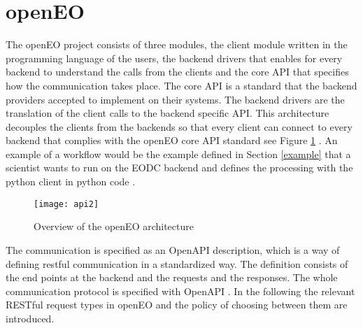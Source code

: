 \documentclass[draft,final]{vutinfth} %
\begin{document}
\section{openEO}\label{openEO}
The openEO project consists of three modules, the client module written in the programming language of the users, the backend drivers that enables for every backend to understand the calls from the clients and the core API that specifies how the communication takes place. The core API is a standard that the backend providers accepted to implement on their systems. The backend drivers are the translation of the client calls to the backend specific API. This architecture decouples the clients from the backends so that every client can connect to every backend that complies with the openEO core API standard see Figure \ref{fig:api2} . An example of a workflow would be the example defined in Section \ref{example} that a scientist wants to run on the EODC backend and defines the processing with the python client in python code \cite{openeo}.  

\begin{figure}[h]
	\centering
	\texttt{[image: api2]}
	\caption{Overview of the openEO architecture}
	\label{fig:api2} %
\end{figure}


The communication is specified as an OpenAPI description, which is a way of defining \gls{rest}ful communication in a standardized way. The definition consists of the end points at the backend and the requests and the responses. The whole communication protocol is specified with OpenAPI \cite{openapi}. 
In the following the relevant RESTful request types in openEO and the policy of choosing between them are introduced.
\end{document}
